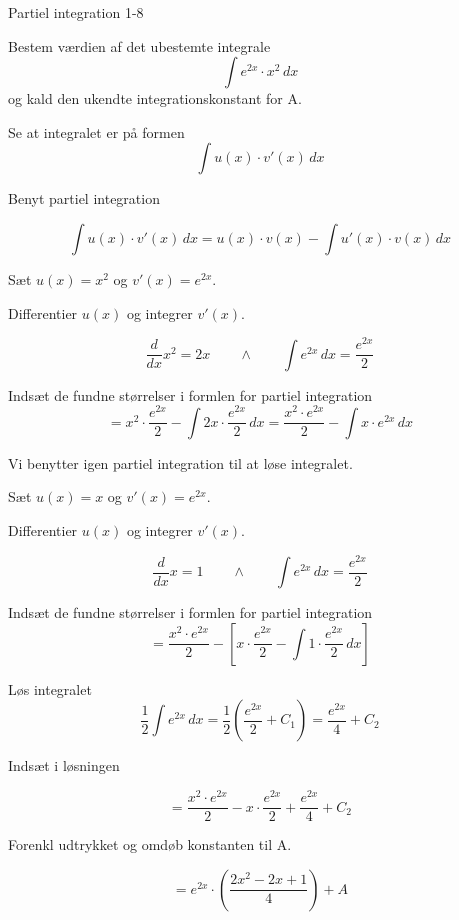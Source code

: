 \documentclass{article}
\begin{document}
\begin{exercise}{Partiel integration 1-8}
	
	
	Bestem værdien af det ubestemte integrale
	\[
	\int e^{2x} \cdot x^2 \, dx
	\]
	og kald den ukendte integrationskonstant for A.
	
	
	
	\hint
	
	Se at integralet er på formen
	\[
	\int u(x) \cdot v'(x) \, dx
	\]
	
	\hint
	
	Benyt partiel integration
	
	\hint
	\[
	\int u(x) \cdot v'(x)\, dx = u(x) \cdot v(x) - \int u'(x) \cdot v(x) \, dx
	\]
	\hint
	
	Sæt $u(x) = x^2$ og $v'(x) = e^{2x}$.
	
	
	\hint
	
	Differentier $u(x)$ og integrer $v'(x)$.
	
	\hint
	\[
	\frac{d}{dx}x^2 = 2x \qquad \wedge \qquad \int e^{2x} \, dx = \frac{e^{2x}}{2}
	\]
	
	\hint
	
	Indsæt de fundne størrelser i formlen for partiel integration
	\[
	= x^2 \cdot  \frac{e^{2x}}{2} - \int 2x \cdot  \frac{e^{2x}}{2} \, dx = \frac{x^2 \cdot e^{2x}}{2} - \int x \cdot e^{2x} \, dx 
	\]
	
	\hint
	
	Vi benytter igen partiel integration til at løse integralet.
	
	\hint
	
	Sæt $u(x) = x$ og $v'(x) = e^{2x}$.
	
	
	\hint
	
	Differentier $u(x)$ og integrer $v'(x)$.
	
	\hint
	\[
	\frac{d}{dx}x = 1 \qquad \wedge \qquad \int e^{2x} \, dx = \frac{e^{2x}}{2}
	\]
	
	\hint
	
	Indsæt de fundne størrelser i formlen for partiel integration
	\[
	= \frac{x^2 \cdot e^{2x}}{2} - \left[ x \cdot \frac{e^{2x}}{2} - \int 1 \cdot \frac{e^{2x}}{2} \, dx \right]
	\]
	
	\hint
	Løs integralet
	\[
	\frac{1}{2} \int e^{2x} \, dx = \frac{1}{2} \left(\frac{e^{2x}}{2} + C_1\right) = \frac{e^{2x}}{4} + C_2
	\]
	
	\hint
	Indsæt i løsningen 
	
	\hint
	
	\[
	= \frac{x^2 \cdot e^{2x}}{2} -x \cdot \frac{e^{2x}}{2} + \frac{e^{2x}}{4} + C_2
	\]
	
	\hint
	
	Forenkl udtrykket og omdøb konstanten til A.
	
	\hint
	
	\[
	=  e^{2x} \cdot \left( \frac{2x^2-2x+1}{4}  \right) + A
	\]
	
	
\end{exercise}
\end{document}
